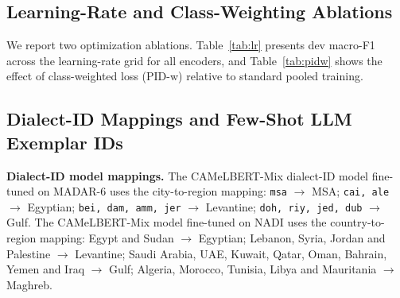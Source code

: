 \documentclass[11pt]{article}
\begin{document}
\begin{table}[htbp]
\caption{Exploratory Maghrebi slice ($n$=21): correct/total with Wilson 95\% interval (single-run systems) or mean$\pm$SD accuracy over five seeds (PID).}
\label{tab:maghrebi}
\centering
\footnotesize
{}
\end{table}

\subsection{Learning-Rate and Class-Weighting Ablations}
\label{app:ablations}
We report two optimization ablations. Table~\ref{tab:lr} presents dev macro-F1 across the learning-rate grid for all encoders, and Table~\ref{tab:pidw} shows the effect of class-weighted loss (PID-w) relative to standard pooled training.

\begin{table}[htbp]
\caption{Learning-rate selection: dev macro-F1 of full fine-tuning for each grid value (PID, seed 42) and the selected rate.}
\label{tab:lr}
\centering
\footnotesize
{}
\end{table}

\begin{table}[htbp]
\caption{Class-weighted fine-tuning (PID-w ablation): change relative to PID (mean over five seeds).}
\label{tab:pidw}
\centering
\footnotesize
{}
\end{table}


\subsection{Dialect-ID Mappings and Few-Shot LLM Exemplar IDs}
\label{app:repro_details}
\textbf{Dialect-ID model mappings.} The CAMeLBERT-Mix dialect-ID model fine-tuned on MADAR-6 uses the city-to-region mapping: \texttt{msa} $\to$ MSA; \texttt{cai, ale} $\to$ Egyptian; \texttt{bei, dam, amm, jer} $\to$ Levantine; \texttt{doh, riy, jed, dub} $\to$ Gulf. The CAMeLBERT-Mix model fine-tuned on NADI uses the country-to-region mapping: Egypt and Sudan $\to$ Egyptian; Lebanon, Syria, Jordan and Palestine $\to$ Levantine; Saudi Arabia, UAE, Kuwait, Qatar, Oman, Bahrain, Yemen and Iraq $\to$ Gulf; Algeria, Morocco, Tunisia, Libya and Mauritania $\to$ Maghreb.
\end{document}
